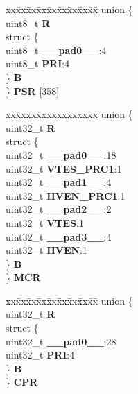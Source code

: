 \begin{DoxyCompactItemize}
\begin{tabbing}
\end{tabbing}\item 
\mbox{\label{structINTC__tag_a129749f6ac0e527536c9ce9240180f0c}} 
\begin{tabbing}
xx\=xx\=xx\=xx\=xx\=xx\=xx\=xx\=xx\=\kill
union \{\\
\>uint8\_t {\bfseries R}\\
\>struct \{\\
\>\>uint8\_t {\bfseries \_\_pad0\_\_}:4\\
\>\>uint8\_t {\bfseries PRI}:4\\
\>\} {\bfseries B}\\
\} {\bfseries PSR} \mbox{[}358\mbox{]}\\

\end{tabbing}\item 
\mbox{\label{structINTC__tag_acb7ef7d7b8ec08ff0ee3826ed3be7270}} 
\begin{tabbing}
xx\=xx\=xx\=xx\=xx\=xx\=xx\=xx\=xx\=\kill
union \{\\
\>uint32\_t {\bfseries R}\\
\>struct \{\\
\>\>uint32\_t {\bfseries \_\_pad0\_\_}:18\\
\>\>uint32\_t {\bfseries VTES\_PRC1}:1\\
\>\>uint32\_t {\bfseries \_\_pad1\_\_}:4\\
\>\>uint32\_t {\bfseries HVEN\_PRC1}:1\\
\>\>uint32\_t {\bfseries \_\_pad2\_\_}:2\\
\>\>uint32\_t {\bfseries VTES}:1\\
\>\>uint32\_t {\bfseries \_\_pad3\_\_}:4\\
\>\>uint32\_t {\bfseries HVEN}:1\\
\>\} {\bfseries B}\\
\} {\bfseries MCR}\\

\end{tabbing}\item 
\mbox{\label{structINTC__tag_aa167239df4ad0a0d462a0320e581797e}} 
\begin{tabbing}
xx\=xx\=xx\=xx\=xx\=xx\=xx\=xx\=xx\=\kill
union \{\\
\>uint32\_t {\bfseries R}\\
\>struct \{\\
\>\>uint32\_t {\bfseries \_\_pad0\_\_}:28\\
\>\>uint32\_t {\bfseries PRI}:4\\
\>\} {\bfseries B}\\
\} {\bfseries CPR}\\


\end{tabbing}
\end{DoxyCompactItemize}

